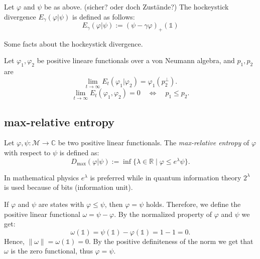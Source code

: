 \begin{definition}
    Let $\varphi$ and $\psi$ be as above. (sicher? oder doch Zustände?)
    The hockeystick divergence $E_\gamma(\varphi|\psi)$ is defined as
    follows:
    \begin{equation}
        E_\gamma(\varphi|\psi) := (\psi - \gamma\varphi)_+(\mathbb{1})
    \end{equation}
\end{definition}

Some facts about the hockeystick divergence.

\begin{proposition}
    Let $\varphi_1, \varphi_2$ be positive lineare functionals over a von Neumann
    algebra, and $p_1, p_2$ are 
    \begin{equation}
        \lim_{t\rightarrow\infty} E_t(\varphi_1| \varphi_2) = \varphi_1(p_2^\perp).
    \end{equation}
    \begin{equation}
        \lim_{t\rightarrow\infty} E_t(\varphi_1, \varphi_2) = 0\quad
        \Longleftrightarrow\quad p_1\leq p_2.
    \end{equation}
\end{proposition}


\subsection{max-relative entropy}

\begin{definition}
    Let $\varphi, \psi:\mathcal{M}\rightarrow \mathbb{C}$
    be two positive linear functionals.
    The \textit{max-relative entropy} of $\varphi$ with respect to $\psi$
    is defined as:
    \begin{equation}
        D_{\max}(\varphi|\psi) := \inf\{\lambda\in\mathbb{R}\mid \varphi\leq e^\lambda \psi\}.
    \end{equation}
\end{definition}

\begin{remark}
    In mathematical physics $e^\lambda$ is preferred while in quantum
    information theory $2^\lambda$ is used because of bits (information unit).
\end{remark}

\begin{remark}
    If $\varphi$ and $\psi$ are states with $\varphi\leq \psi$, then
    $\varphi = \psi$ holds.
    Therefore, we define the positive linear functional $\omega = \psi-\varphi$.
    By the normalized property of $\varphi$ and $\psi$ we get:
    \begin{equation}
        \omega(\mathbb{1}) = \psi(\mathbb{1}) - \varphi(\mathbb{1}) = 1-1 = 0.
    \end{equation}
    Hence, $\lVert \omega \rVert = \omega(\mathbb{1}) = 0$.
    By the positive definiteness of the norm we get that $\omega$ is the
    zero functional, thus $\varphi = \psi$.
\end{remark}

